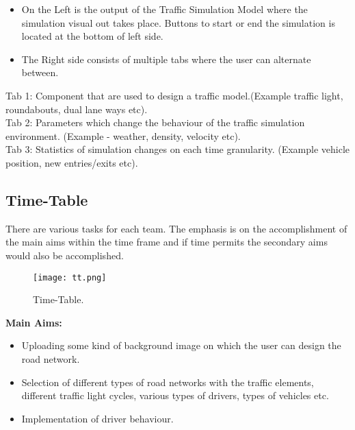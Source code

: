 \documentclass[11pt]{article}
\begin{document}
\begin{itemize}
\item On the Left is the output of the Traffic Simulation Model where the simulation visual out takes place. Buttons to start or end the simulation is located at  the bottom of left side.
\end{itemize}

\begin{itemize}
\item The Right side consists of multiple tabs where the user can alternate between.
\end{itemize}
Tab 1: Component that are used to design a traffic model.(Example traffic light, roundabouts, dual lane ways etc).\\
Tab 2: Parameters which change the behaviour of the traffic simulation environment. (Example - weather, density, velocity etc).\\
Tab 3: Statistics of simulation changes on each time granularity. (Example vehicle position, new entries/exits etc).


\subsection{Time-Table}

There are various tasks for each team. The emphasis is on the accomplishment of the main aims within the time frame and if time permits the secondary aims would also be accomplished.

\begin{figure}[!ht]
\centering
\texttt{[image: tt.png]}
\caption{\label{fig:tt}Time-Table.}
\end{figure}

\textbf{Main Aims:}

\begin{itemize}
\item Uploading some kind of background image on which the user can design the road network.
\end{itemize}

\begin{itemize}
\item Selection of different types of road networks with the traffic elements, different traffic light cycles, various types of drivers, types of vehicles etc.
\end{itemize}

\begin{itemize}
\item Implementation of driver behaviour.
\end{itemize}
\end{document}
